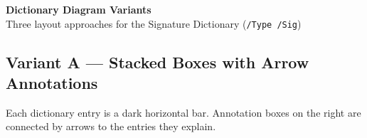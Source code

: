 \documentclass[11pt,a4paper]{article}
\begin{document}
\begin{center}
{\LARGE\bfseries\sffamily\color{accent} Dictionary Diagram Variants}\\[4pt]
{\normalsize\sffamily Three layout approaches for the Signature Dictionary (\texttt{/Type /Sig})}
\end{center}

\vspace{1em}

\subsection*{\sffamily\color{accent} Variant A — Stacked Boxes with Arrow Annotations}

{\small Each dictionary entry is a dark horizontal bar. Annotation boxes on the right
are connected by arrows to the entries they explain.}

\vspace{0.6em}
\end{document}
